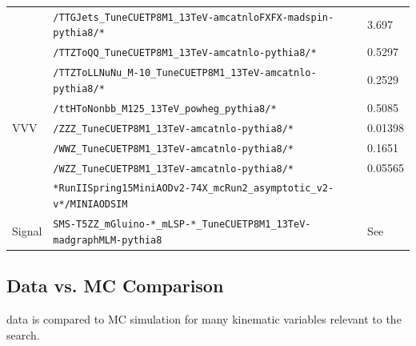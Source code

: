 \begin{table}
\begin{center}
\begin{tabular}{l|l|l}
            & \verb=/TTGJets_TuneCUETP8M1_13TeV-amcatnloFXFX-madspin-pythia8/*=           & 3.697        \\
            & \verb=/TTZToQQ_TuneCUETP8M1_13TeV-amcatnlo-pythia8/*=                       & 0.5297       \\
            & \verb=/TTZToLLNuNu_M-10_TuneCUETP8M1_13TeV-amcatnlo-pythia8/*=              & 0.2529       \\
            & \verb=/ttHToNonbb_M125_13TeV_powheg_pythia8/*=                              & 0.5085       \\
\hline
VVV         & \verb=/ZZZ_TuneCUETP8M1_13TeV-amcatnlo-pythia8/*=                           & 0.01398      \\
            & \verb=/WWZ_TuneCUETP8M1_13TeV-amcatnlo-pythia8/*=                           & 0.1651       \\
            & \verb=/WZZ_TuneCUETP8M1_13TeV-amcatnlo-pythia8/*=                           & 0.05565      \\
\hline
            & \verb=*RunIISpring15MiniAODv2-74X_mcRun2_asymptotic_v2-v*/MINIAODSIM=       &              \\
\hline
Signal      & \verb=SMS-T5ZZ_mGluino-*_mLSP-*_TuneCUETP8M1_13TeV-madgraphMLM-pythia8=     & See~\cite{gluinoxsec13tev} \\
\hline
\hline
\end{tabular}
\end{center}
\end{table}

\clearpage

\subsection{Data vs. MC Comparison}
\label{ssec:datavsmc}
data is compared to MC simulation for many kinematic variables relevant to the search.

